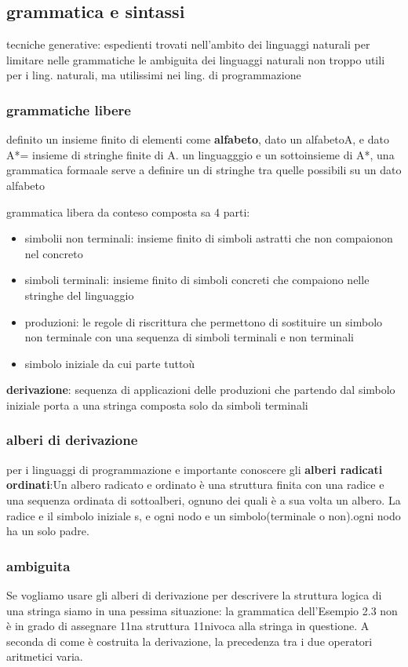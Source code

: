 \documentclass[12pt]{article}
\begin{document}
\subsection{grammatica e sintassi}
tecniche generative: espedienti trovati nell'ambito dei linguaggi naturali per limitare nelle grammatiche le ambiguita dei linguaggi naturali
non troppo utili per i ling. naturali, ma utilissimi nei ling. di programmazione

\subsubsection{grammatiche libere}
definito un insieme finito di elementi come \textbf{alfabeto}, dato un alfabetoA, e dato A*= insieme di stringhe finite di A.
un linguagggio e un sottoinsieme di A*, una grammatica formaale serve a definire un di stringhe tra quelle possibili su un dato alfabeto

grammatica libera da conteso composta sa 4 parti:
\begin{itemize}
    \item simbolii non terminali: insieme finito di simboli astratti che non compaionon nel concreto
    \item simboli terminali: insieme finito di simboli concreti che compaiono nelle stringhe del linguaggio
    \item produzioni: le regole di riscrittura che permettono di sostituire un simbolo non terminale con una sequenza di simboli terminali e non terminali
    \item simbolo iniziale da cui parte tuttoù
    \end{itemize}
   \textbf{derivazione}: sequenza di applicazioni delle produzioni che partendo dal simbolo iniziale porta a una stringa composta solo da simboli terminali
\subsubsection{alberi di derivazione}
   per i linguaggi di programmazione e importante conoscere gli \textbf{alberi radicati ordinati}:Un albero radicato e ordinato è una struttura finita con una radice e una sequenza ordinata di sottoalberi, ognuno dei quali è a sua volta un albero. La radice e il simbolo iniziale s, e ogni nodo e un simbolo(terminale o non).ogni nodo ha un solo padre.

   
\subsubsection{ambiguita}
Se vogliamo usare gli alberi di derivazione per descrivere
la struttura logica di una stringa siamo in una pessima situazione: la grammatica
dell'Esempio 2.3 non è in grado di assegnare 11na struttura 11nivoca alla stringa in
questione. A seconda di come è costruita la derivazione, la precedenza tra i due
operatori aritmetici varia.
\end{document}
